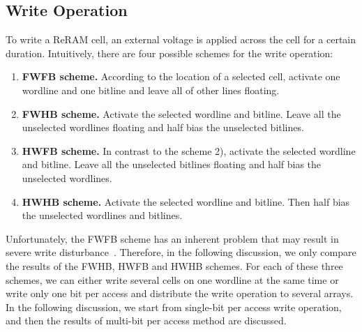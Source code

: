 \subsection{Write Operation}
To write a ReRAM cell, an external voltage is applied across the cell for
a certain duration. Intuitively, there are four possible schemes for the
write operation:
\begin{enumerate}
  \item \textbf{FWFB scheme.} According to the location of a selected cell, activate one
      wordline and one bitline and leave all of other lines floating.
  \item \textbf{FWHB scheme.} Activate the selected wordline and bitline. Leave all the
      unselected wordlines floating and half bias the unselected
      bitlines.%
  \item \textbf{HWFB scheme.} In contrast to the scheme 2), activate the selected wordline
      and bitline. Leave all the unselected bitlines floating and half       bias the unselected wordlines. %
  \item \textbf{HWHB scheme.} Activate the selected wordline and bitline. Then half bias the       unselected wordlines and bitlines. %
\end{enumerate}
Unfortunately, the FWFB scheme has an inherent problem that may result in
severe write disturbance~\cite{crossbar_NANO2003_Ziegler}. Therefore, in
the following discussion, we only compare the results of the FWHB, HWFB
and HWHB schemes. For each of these three schemes, we can either write
several cells on one wordline at the same time or write only one bit per
access and distribute the write operation to several arrays. In the
following discussion, we start from single-bit per access write operation,
and then the results of multi-bit per access method are discussed.

